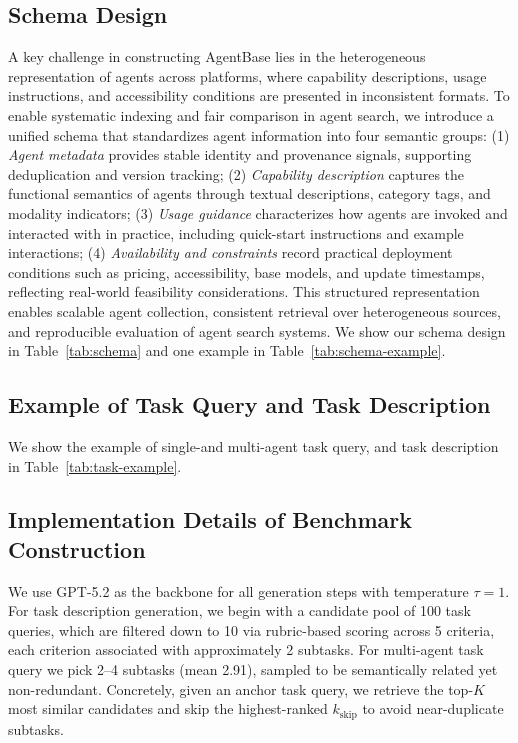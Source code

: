 \documentclass{article} %
\def \TAB {Table}
\begin{document}
\subsection{Schema Design}

A key challenge in constructing AgentBase lies in the heterogeneous representation of agents across platforms, where capability descriptions, usage instructions, and accessibility conditions are presented in inconsistent formats. To enable systematic indexing and fair comparison in agent search, we introduce a unified schema that standardizes agent information into four semantic groups:
(1) \textit{Agent metadata} provides stable identity and provenance signals, supporting deduplication and version tracking;
(2) \textit{Capability description} captures the functional semantics of agents through textual descriptions, category tags, and modality indicators;
(3) \textit{Usage guidance} characterizes how agents are invoked and interacted with in practice, including quick-start instructions and example interactions;
(4) \textit{Availability and constraints} record practical deployment conditions such as pricing, accessibility, base models, and update timestamps, reflecting real-world feasibility considerations.
This structured representation enables scalable agent collection, consistent retrieval over heterogeneous sources, and reproducible evaluation of agent search systems.
We show our schema design in \TAB~\ref{tab:schema} and one example in \TAB~\ref{tab:schema-example}.

\subsection{Example of Task Query and Task Description}

We show the example of single-and multi-agent task query, and task description in \TAB~\ref{tab:task-example}.

\subsection{Implementation Details of Benchmark Construction}

We use GPT-5.2 as the backbone for all generation steps with temperature $\tau = 1$. For task description generation, we begin with a candidate pool of 100 task queries, which are filtered down to 10 via rubric-based scoring across 5 criteria, each criterion associated with approximately 2 subtasks. For multi-agent task query we pick 2–4 subtasks (mean 2.91), sampled to be semantically related yet non-redundant. Concretely, given an anchor task query, we retrieve the top-$K$ most similar candidates and skip the highest-ranked $k_{\text{skip}}$ to avoid near-duplicate subtasks.
\end{document}
